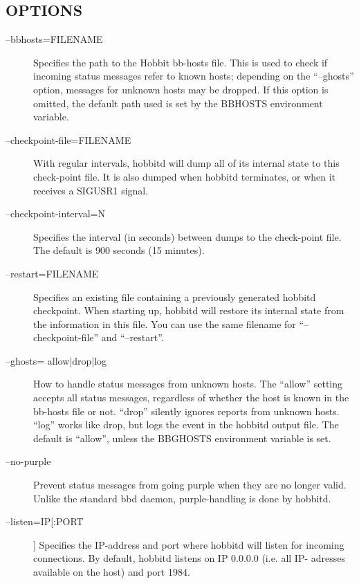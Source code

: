  
\subsection{OPTIONS}
\begin{description}
\item[--bbhosts=FILENAME] Specifies the path to the Hobbit bb-hosts file. This is used to check if incoming status messages refer to known hosts; depending on the ``--ghosts'' option, messages for unknown hosts may be dropped. If this option is omitted, the default path used is set by the BBHOSTS environment variable. 

 

\item[--checkpoint-file=FILENAME] With regular intervals, hobbitd will dump all of its internal state to this check-point file. It is also dumped when hobbitd terminates, or when it receives a SIGUSR1 signal. 

 

\item[--checkpoint-interval=N] Specifies the interval (in seconds) between dumps to the check-point file. The default is 900 seconds (15 minutes). 

 

\item[--restart=FILENAME] Specifies an existing file containing a previously generated hobbitd checkpoint. When starting up, hobbitd will restore its internal state from the information in this file. You can use the same filename for ``--checkpoint-file'' and ``--restart''. 

 

\item[--ghosts= {allow|drop|log}] How to handle status messages from unknown hosts. The ``allow'' setting accepts all status messages, regardless of whether the host is known in the bb-hosts file or not. ``drop'' silently ignores reports from unknown hosts. ``log'' works like drop, but logs the event in the hobbitd output file. The default is ``allow'', unless the BBGHOSTS environment variable is set. 

 

\item[--no-purple] Prevent status messages from going purple when they are no longer valid. Unlike the standard bbd daemon, purple-handling is done by hobbitd. 

 

\item[--listen=IP[:PORT]] Specifies the IP-address and port where hobbitd will listen for incoming connections. By default, hobbitd listens on IP 0.0.0.0 (i.e. all IP- adresses available on the host) and port 1984. 


\end{description}
